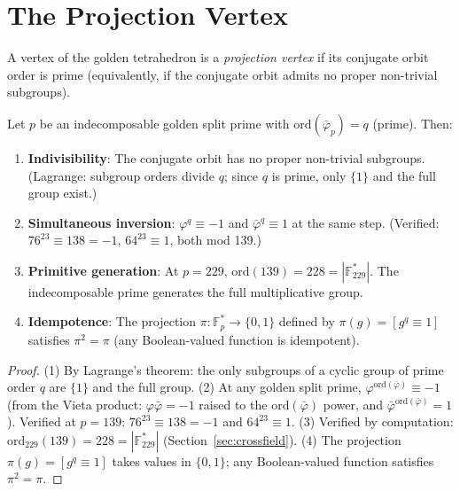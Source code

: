 \section{The Projection Vertex}
\label{sec:projection}

\begin{definition}
A vertex of the golden tetrahedron is a \emph{projection vertex}
if its conjugate orbit order is prime (equivalently, if the
conjugate orbit admits no proper non-trivial subgroups).
\end{definition}

\begin{theorem}
\label{thm:projection}
Let $p$ be an indecomposable golden split prime with
$\mathrm{ord}(\bar\varphi_p) = q$ (prime). Then:
\begin{enumerate}
  \item \textbf{Indivisibility}: The conjugate orbit has no proper
    non-trivial subgroups. (Lagrange: subgroup orders divide $q$;
    since $q$ is prime, only $\{1\}$ and the full group exist.)
  \item \textbf{Simultaneous inversion}: $\varphi^q \equiv -1$ and
    $\bar\varphi^q \equiv 1$ at the same step.
    (Verified: $76^{23} \equiv 138 = -1$, $64^{23} \equiv 1$, both mod 139.)
  \item \textbf{Primitive generation}: At $p = 229$,
    $\mathrm{ord}(139) = 228 = |\mathbb{F}_{229}^*|$.
    The indecomposable prime generates the full multiplicative group.
  \item \textbf{Idempotence}: The projection
    $\pi: \mathbb{F}_p^* \to \{0, 1\}$ defined by
    $\pi(g) = [g^q \equiv 1]$ satisfies $\pi^2 = \pi$
    (any Boolean-valued function is idempotent).
\end{enumerate}
\end{theorem}

\begin{proof}
(1) By Lagrange's theorem: the only subgroups of a cyclic group of prime order $q$ are $\{1\}$ and the full group.
(2) At any golden split prime, $\varphi^{\mathrm{ord}(\bar{\varphi})} \equiv -1$ (from the Vieta product: $\varphi \bar{\varphi} = -1$ raised to the $\mathrm{ord}(\bar{\varphi})$ power, and $\bar{\varphi}^{\mathrm{ord}(\bar{\varphi})} = 1$). Verified at $p=139$: $76^{23} \equiv 138 = -1$ and $64^{23} \equiv 1$.
(3) Verified by computation: $\mathrm{ord}_{229}(139) = 228 = |\mathbb{F}_{229}^*|$ (Section~\ref{sec:crossfield}).
(4) The projection $\pi(g) = [g^q \equiv 1]$ takes values in $\{0,1\}$; any Boolean-valued function satisfies $\pi^2 = \pi$. \qedhere
\end{proof}

